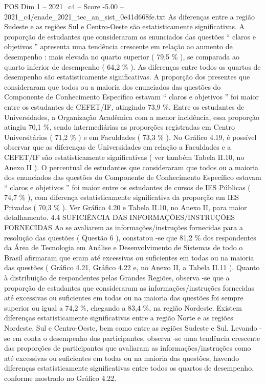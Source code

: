 \begin{textsample}{POS Dim 1 – 2021\_c4 – Score -5.00 – 2021\_c4/enade\_2021\_tec\_an\_sist\_0e41d668fe.txt}
As diferenças entre a região Sudeste e as regiões Sul e Centro-Oeste são estatisticamente significativas.
A proporção de estudantes que consideraram os enunciados das questões “ claros e objetivos ” apresenta uma tendência crescente em relação ao aumento de desempenho : mais elevada no quarto superior ( 79,5 \% ), se comparada ao quarto inferior de desempenho ( 64,2 \% ).
As diferenças entre todos os quartos de desempenho são estatisticamente significativas.
A proporção dos presentes que consideraram que todos ou a maioria dos enunciados das questões do Componente de Conhecimento Específico estavam “ claros e objetivos ” foi maior entre os estudantes de CEFET/IF, atingindo 73,9 \%.
Entre os estudantes de Universidades, a Organização Acadêmica com a menor incidência, essa proporção atingiu 70,1 \%, sendo intermediárias as proporções registradas em Centro Universitários ( 71,2 \% ) e em Faculdades ( 73,3 \% ).
No Gráfico 4.19, é possível observar que as diferenças de Universidades em relação a Faculdades e a CEFET/IF são estatisticamente significativas ( ver também Tabela II.10, no Anexo II ).
O percentual de estudantes que consideraram que todos ou a maioria dos enunciados das questões do Componente de Conhecimento Específico estavam “ claros e objetivos ” foi maior entre os estudantes de cursos de IES Públicas ( 74,7 \% ), com diferença estatisticamente significativa da proporção em IES Privadas ( 70,3 \% ).
Ver Gráfico 4.20 e Tabela II.10, no Anexo II, para maior detalhamento. 4.4 SUFICIÊNCIA DAS INFORMAÇÕES/INSTRUÇÕES FORNECIDAS Ao se avaliarem as informações/instruções fornecidas para a resolução das questões ( Questão 6 ), constatou -se que 81,2 \% dos respondentes da Área de Tecnologia em Análise e Desenvolvimento de Sistemas de todo o Brasil afirmaram que eram até excessivas ou suficientes em todas ou na maioria das questões ( Gráfico 4.21, Gráfico 4.22 e, no Anexo II, a Tabela II.11 ).
Quanto à distribuição de respondentes pelas Grandes Regiões, observa -se que a proporção de estudantes que consideraram as informações/instruções fornecidas até excessivas ou suficientes em todas ou na maioria das questões foi sempre superior ou igual a 74,2 \%, chegando a 83,4 \%, na região Nordeste.
Existem diferenças estatisticamente significativas entre a região Norte e as regiões Nordeste, Sul e Centro-Oeste, bem como entre as regiões Sudeste e Sul.
Levando -se em conta o desempenho dos participantes, observa -se uma tendência crescente das proporções de participantes que avaliaram as informações/instruções como até excessivas ou suficientes em todas ou na maioria das questões, havendo diferenças estatisticamente significativas entre todos os quartos de desempenho, conforme mostrado no Gráfico 4.22.

\end{textsample}

